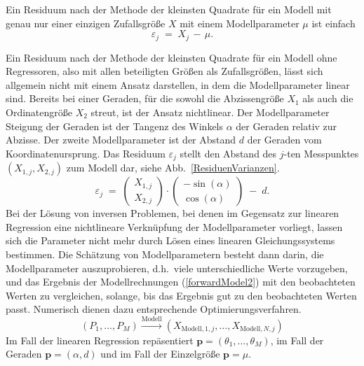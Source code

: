 Ein Residuum nach der Methode der kleinsten Quadrate für ein Modell mit genau nur einer
einzigen Zufallsgröße $X$ mit einem Modellparameter $\mu$ ist einfach
\begin{equation}
\varepsilon_j \; = \; X_j \, - \, \mu .
\label{oneQuantityOnly1}
\end{equation}

Ein Residuum nach der Methode der kleinsten Quadrate für ein Modell ohne Regressoren,
also mit allen beteiligten Größen als Zufallsgrößen, lässt sich allgemein nicht mit
einem Ansatz darstellen, in dem die Modellparameter linear sind. Bereits bei einer
Geraden, für die sowohl die Abzissengröße $X_1$ als auch die Ordinatengröße $X_2$ streut,
ist der Ansatz nichtlinear. Der Modellparameter Steigung der Geraden ist der Tangenz des
Winkels $\alpha$ der Geraden relativ zur Abzisse. Der zweite Modellparameter
ist der Abstand $d$ der Geraden vom Koordinatenursprung. Das Residuum $\varepsilon_j$ stellt den
Abstand des $j$-ten Messpunktes $(X_{1,j}, X_{2,j})$ zum Modell dar, siehe Abb.~\ref{ResiduenVarianzen}.
\begin{equation}
\varepsilon_j \; = \; 
\left(\begin{array}{c} X_{1,j}\\ X_{2,j}\end{array}\right) \cdot
\left(\begin{array}{c} -\sin(\alpha)\\ \cos(\alpha)\end{array}\right) \; - \; d .
\label{TLSgerade}
\end{equation}
Bei der Lösung von inversen Problemen, bei denen im Gegensatz zur linearen
Regression eine nichtlineare Verknüpfung der Modellparameter vorliegt, lassen
sich die Parameter nicht mehr durch Lösen eines linearen Gleichungssystems bestimmen.
Die Schätzung von Modellparametern besteht dann darin, die Modellparameter auszuprobieren,
d.h.\ viele unterschiedliche Werte vorzugeben, und das Ergebnis der 
Modellrechnungen (\ref{forwardModel2}) mit den beobachteten Werten zu vergleichen, solange,
bis das Ergebnis \glqq gut zu den beobachteten Werten passt\grqq. Numerisch dienen
dazu entsprechende Optimierungsverfahren.
\begin{equation}
(P_1, \dots, P_M) \xrightarrow{\mathrm{Modell}} (X_{\mathrm{Modell},1,j}, \dots, X_{\mathrm{Modell},N,j})
\label{forwardModel2}
\end{equation} 
Im Fall der linearen Regression repäsentiert $\mathbf{p} = (\theta_1,\dots,\theta_M)$,
im Fall der Geraden $\mathbf{p} = (\alpha, d)$ und im Fall der Einzelgröße
$\mathbf{p} = \mu$.

